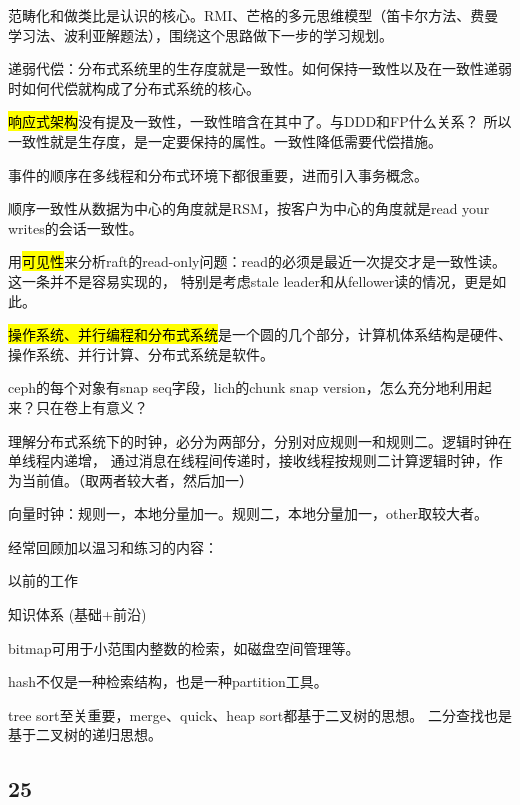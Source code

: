\hrulefill

范畴化和做类比是认识的核心。RMI、芒格的多元思维模型（笛卡尔方法、费曼学习法、波利亚解题法），围绕这个思路做下一步的学习规划。

递弱代偿：分布式系统里的生存度就是一致性。如何保持一致性以及在一致性递弱时如何代偿就构成了分布式系统的核心。

\hrulefill

\hl{响应式架构}没有提及一致性，一致性暗含在其中了。与DDD和FP什么关系？
所以一致性就是生存度，是一定要保持的属性。一致性降低需要代偿措施。

事件的顺序在多线程和分布式环境下都很重要，进而引入事务概念。

顺序一致性从数据为中心的角度就是RSM，按客户为中心的角度就是read your writes的会话一致性。

用\hl{可见性}来分析raft的read-only问题：read的必须是最近一次提交才是一致性读。这一条并不是容易实现的，
特别是考虑stale leader和从fellower读的情况，更是如此。

\hl{操作系统、并行编程和分布式系统}是一个圆的几个部分，计算机体系结构是硬件、
操作系统、并行计算、分布式系统是软件。

\hrulefill

ceph的每个对象有snap seq字段，lich的chunk snap version，怎么充分地利用起来？只在卷上有意义？

理解分布式系统下的时钟，必分为两部分，分别对应规则一和规则二。逻辑时钟在单线程内递增，
通过消息在线程间传递时，接收线程按规则二计算逻辑时钟，作为当前值。（取两者较大者，然后加一）

向量时钟：规则一，本地分量加一。规则二，本地分量加一，other取较大者。

\hrulefill

经常回顾加以温习和练习的内容：
\begin{enumbox}
\item 以前的工作
\item 知识体系 (基础+前沿)
\end{enumbox}

bitmap可用于小范围内整数的检索，如磁盘空间管理等。

hash不仅是一种检索结构，也是一种partition工具。

tree sort至关重要，merge、quick、heap sort都基于二叉树的思想。
二分查找也是基于二叉树的递归思想。

\subsection{25}

